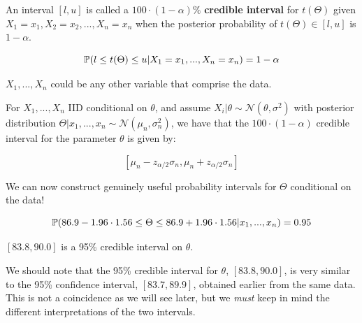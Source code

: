 \documentclass[a4paper]{article}
\begin{document}
                \begin{definition}
                    An interval $[l, u]$ is called a $100 \cdot (1 - \alpha)\%$
                    \textbf{credible interval} for $t(\Theta)$ given $X_1 = x_1,
                    X_2 = x_2, ..., X_n = x_n$ when the posterior probability of
                    $t(\Theta) \in [l, u]$ is $1 - \alpha$.

                    \[
                        \mathbb{P}(l \leq t(\Theta) \leq u | X_1 = x_1, ..., X_n =
                        x_n) = 1 - \alpha
                    \]

                    $X_1, ..., X_n$ could be any other variable that comprise
                    the data.

                    For $X_1, ..., X_n$ IID conditional on $\theta$, and assume
                    $X_i | \theta \sim \mathcal{N}(\theta, \sigma^2)$ with
                    posterior distribution $\Theta | x_1, ..., x_n \sim
                    \mathcal{N}(\mu_n, \sigma_n^2)$, we have that the $100 \cdot
                    (1 - \alpha)$ credible interval for the parameter $\theta$
                    is given by:

                    \[
                        [\mu_n - z_{\alpha/2}\sigma_n, \mu_n +
                        z_{\alpha/2}\sigma_n]
                    \]
                \end{definition}

                We can now construct genuinely useful probability intervals for
                $\Theta$ conditional on the data!

                \[
                    \mathbb{P}(86.9 - 1.96 \cdot 1.56 \leq \Theta \leq 86.9 + 1.96
                    \cdot 1.56 | x_1, ..., x_n) = 0.95
                \]

                $[83.8, 90.0]$ is a 95\% credible interval on $\theta$.

                \begin{warn}
                    We should note that the 95\% credible interval for $\theta$,
                    $[83.8, 90.0]$, is very similar to the 95\% confidence
                    interval, $[83.7, 89.9]$, obtained earlier from the same
                    data. This is not a coincidence as we will see later, but we
                    \textit{must} keep in mind the different interpretations of
                    the two intervals.
                \end{warn}
\end{document}
